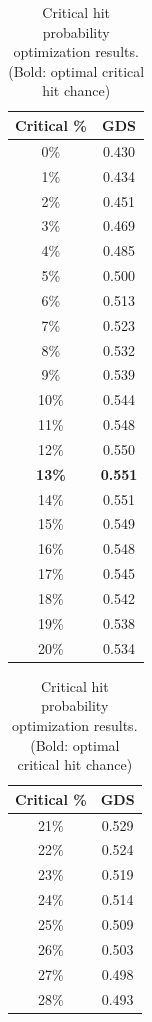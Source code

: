 \documentclass[manuscript,review,anonymous]{acmart}
\theoremstyle{definition}
\theoremstyle{plain}
\begin{document}
\begin{table}
  \caption{Critical hit probability optimization results. (Bold: optimal critical hit chance)}
  \label{tab:critical_hit_optimization}
  \begin{minipage}[t]{0.45\columnwidth}
    \raggedleft
    \begin{tabular}{cc}
      \toprule
      Critical \% & GDS \\
      \midrule
      0\% & 0.430 \\
      1\% & 0.434 \\
      2\% & 0.451 \\
      3\% & 0.469 \\
      4\% & 0.485 \\
      5\% & 0.500 \\
      6\% & 0.513 \\
      7\% & 0.523 \\
      8\% & 0.532 \\
      9\% & 0.539 \\
      10\% & 0.544 \\
      11\% & 0.548 \\
      12\% & 0.550 \\
      \textbf{13\%} & \textbf{0.551} \\
      14\% & 0.551 \\
      15\% & 0.549 \\
      16\% & 0.548 \\
      17\% & 0.545 \\
      18\% & 0.542 \\
      19\% & 0.538 \\
      20\% & 0.534 \\
      \bottomrule
    \end{tabular}
  \end{minipage}
  \hfill
  \begin{minipage}[t]{0.45\columnwidth}
    \raggedright
    \begin{tabular}{cc}
      \toprule
      Critical \% & GDS \\
      \midrule
      21\% & 0.529 \\
      22\% & 0.524 \\
      23\% & 0.519 \\
      24\% & 0.514 \\
      25\% & 0.509 \\
      26\% & 0.503 \\
      27\% & 0.498 \\
      28\% & 0.493 \\

\end{tabular}
\end{minipage}
\end{table}
\end{document}
